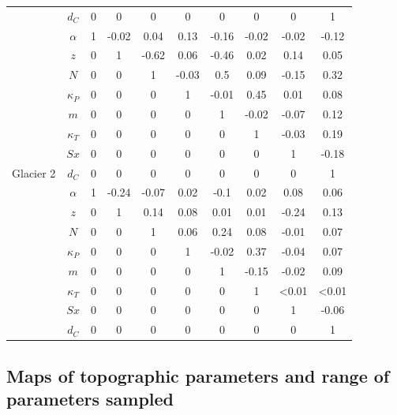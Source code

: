 \documentclass[12pt]{article}
\begin{document}
\begin{table}[]
\begin{tabular}{cccccccccc}
\rowcolor[HTML]{EFEFEF} 
\multirow{-8}{*}{\cellcolor[HTML]{EFEFEF}Glacier 4} & \textbf{$d_C$} & 0 & 0 & 0 & 0 & 0 & 0 & 0 & 1 \\
 & \textbf{$\alpha$} & 1 & -0.02 & 0.04 & 0.13 & -0.16 & -0.02 & -0.02 & -0.12 \\
 & \textbf{$z$} & 0 & 1 & -0.62 & 0.06 & -0.46 & 0.02 & 0.14 & 0.05 \\
 & \textbf{$N$} & 0 & 0 & 1 & -0.03 & 0.5 & 0.09 & -0.15 & 0.32 \\
 & $\kappa_P$ & 0 & 0 & 0 & 1 & -0.01 & 0.45 & 0.01 & 0.08 \\
 & $m$ & 0 & 0 & 0 & 0 & 1 & -0.02 & -0.07 & 0.12 \\
 & $\kappa_T$ & 0 & 0 & 0 & 0 & 0 & 1 & -0.03 & 0.19 \\
 & $Sx$ & 0 & 0 & 0 & 0 & 0 & 0 & 1 & -0.18 \\
\multirow{-8}{*}{Glacier 2} & $d_C$ & 0 & 0 & 0 & 0 & 0 & 0 & 0 & 1 \\
\rowcolor[HTML]{EFEFEF} 
\cellcolor[HTML]{EFEFEF} & $\alpha$ & 1 & -0.24 & -0.07 & 0.02 & -0.1 & 0.02 & 0.08 & 0.06 \\
\rowcolor[HTML]{EFEFEF} 
\cellcolor[HTML]{EFEFEF} & $z$ & 0 & 1 & 0.14 & 0.08 & 0.01 & 0.01 & -0.24 & 0.13 \\
\rowcolor[HTML]{EFEFEF} 
\cellcolor[HTML]{EFEFEF} & $N$ & 0 & 0 & 1 & 0.06 & 0.24 & 0.08 & -0.01 & 0.07 \\
\rowcolor[HTML]{EFEFEF} 
\cellcolor[HTML]{EFEFEF} & $\kappa_P$ & 0 & 0 & 0 & 1 & -0.02 & 0.37 & -0.04 & 0.07 \\
\rowcolor[HTML]{EFEFEF} 
\cellcolor[HTML]{EFEFEF} & $m$ & 0 & 0 & 0 & 0 & 1 & -0.15 & -0.02 & 0.09 \\
\rowcolor[HTML]{EFEFEF} 
\cellcolor[HTML]{EFEFEF} & \textbf{$\kappa_T$} & 0 & 0 & 0 & 0 & 0 & 1 &\textless 0.01 & \textless 0.01 \\
\rowcolor[HTML]{EFEFEF} 
\cellcolor[HTML]{EFEFEF} & \textbf{$Sx$} & 0 & 0 & 0 & 0 & 0 & 0 & 1 & -0.06 \\
\rowcolor[HTML]{EFEFEF} 
\multirow{-8}{*}{\cellcolor[HTML]{EFEFEF}Glacier 13} & \textbf{$d_C$} & 0 & 0 & 0 & 0 & 0 & 0 & 0 & 1
\end{tabular}
\end{table}

\subsection{Maps of topographic parameters and range of parameters sampled}
\end{document}
